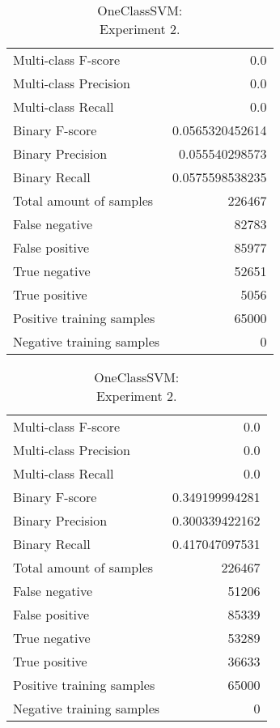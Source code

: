 \begin{table}[H]
\begin{minipage}{0.5\textwidth}
\caption{OneClassSVM: \\Experiment 1.}

\centering
\begin{tabular}{l r}
\toprule
Multi-class F-score & 0.0 \\
Multi-class Precision & 0.0 \\
Multi-class Recall & 0.0 \\
\midrule
Binary F-score & 0.0565320452614 \\
Binary Precision & 0.055540298573 \\
Binary Recall & 0.0575598538235 \\
\midrule
Total amount of samples & 226467 \\

False negative & 82783 \\
False positive & 85977 \\
True negative & 52651 \\
True positive & 5056 \\
\midrule
Positive training samples & 65000 \\
Negative training samples & 0 \\
\bottomrule
\end{tabular}

\end{minipage}
\hfillx
\begin{minipage}{0.5\textwidth}
\caption{OneClassSVM: \\Experiment 2.}

\centering
\begin{tabular}{l r}
\toprule
Multi-class F-score & 0.0 \\
Multi-class Precision & 0.0 \\
Multi-class Recall & 0.0 \\
\midrule
Binary F-score & 0.349199994281 \\
Binary Precision & 0.300339422162 \\
Binary Recall & 0.417047097531 \\
\midrule
Total amount of samples & 226467 \\

False negative & 51206 \\
False positive & 85339 \\
True negative & 53289 \\
True positive & 36633 \\
\midrule
Positive training samples & 65000 \\
Negative training samples & 0 \\
\bottomrule
\end{tabular}
\end{minipage}
\end{table}
